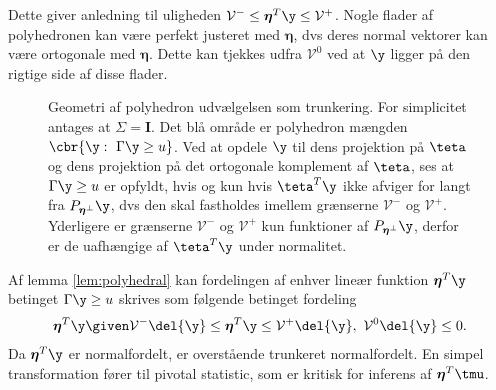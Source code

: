 Dette giver anledning til uligheden \(\mathcal{V}^- \leq \boldsymbol{\eta}^T \y \leq \mathcal{V}^+\).
Nogle flader af polyhedronen kan være perfekt justeret med \(\boldsymbol{\eta}\), dvs deres normal vektorer kan være ortogonale med \(\boldsymbol{\eta}\).
Dette kan tjekkes udfra \(\mathcal{V}^0\) ved at \(\y\) ligger på den rigtige side af disse flader.  

%
\begin{figure}[H]
\centering
\scalebox{1}{}
\caption{Geometri af polyhedron udvælgelsen som trunkering. For simplicitet antages at \(\Sigma = \mathbf{I}\). Det blå område er polyhedron mængden \(\cbr{\y : \ \Gamma \y \geq u}\).
Ved at opdele \(\y\) til dens projektion på \(\teta\) og dens projektion på det ortogonale komplement af \(\teta\), ses at \(\Gamma \y \geq u\) er opfyldt, hvis og kun hvis \(\teta^T \y\) ikke afviger for langt fra \(P_{\boldsymbol{\eta}^\perp} \y\), dvs den skal fastholdes imellem grænserne \(\mathcal{V}^-\) og \(\mathcal{V}^+\).
Yderligere er grænserne \(\mathcal{V}^-\) og \(\mathcal{V}^+\) kun funktioner af \(P_{\boldsymbol{\eta}^\perp} \y\), derfor er de uafhængige af \(\teta^T \y\) under normalitet.} \label{fig:polyhedron}
\end{figure}
%

Af lemma \ref{lem:polyhedral} kan fordelingen af enhver lineær funktion \(\boldsymbol{\eta}^T \y\) betinget \(\Gamma \y \geq u\) skrives som følgende betinget fordeling
\begin{align*}
\boldsymbol{\eta}^T \y \given \mathcal{V}^- \del{\y} \leq \boldsymbol{\eta}^T \y \leq \mathcal{V}^+ \del{\y}, \ \mathcal{V}^0 \del{\y} \leq 0.
\end{align*}
Da \(\boldsymbol{\eta}^T \y\) er normalfordelt, er overstående trunkeret normalfordelt.
En simpel transformation fører til pivotal statistic, som er kritisk for inferens af \(\boldsymbol{\eta}^T \tmu\).

